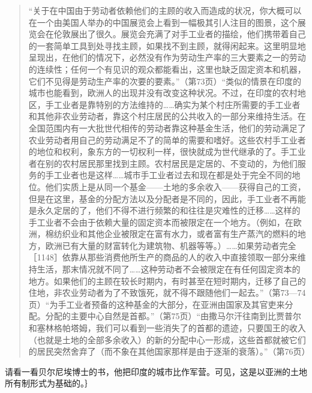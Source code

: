 \begin{quote}{“关于在中国由于劳动者依赖他们的主顾的收入而造成的状况，你大概可以在一个由美国人举办的中国展览会上看到一幅极其引人注目的图景，这个展览会在伦敦展出了很久。展览会充满了对手工业者的描绘，他们携带着自己的一套简单工具到处寻找主顾，如果找不到主顾，就得闲起来。这里明显地呈现出，在他们的情况下，必然没有作为劳动生产率的三大要素之一的劳动的连续性；任何一个有见识的观众都能看出，这里也缺乏固定资本和机器，它们不见得是劳动生产率的次要的要素。”（第73页）“类似的情景在印度的城市也能看到，欧洲人的出现并没有改变这种状况。不过，在印度的农村地区，手工业者是靠特别的方法维持的……确实为某个村庄所需要的手工业者和其他非农业劳动者，靠这个村庄居民的公共收入的一部分来维持生活。在全国范围内有一大批世代相传的劳动者靠这种基金生活，他们的劳动满足了农业劳动者用自己的劳动满足不了的简单的需要和嗜好。这些农村手工业者的地位和权利，象东方的一切权利一样，很快就成为世代继承的了。手工业者在别的农村居民那里找到主顾。农村居民是定居的、不变动的，为他们服务的手工业者也是这样……城市手工业者过去和现在都是处于完全不同的地位。他们实质上是从同一个基金——土地的多余收入——获得自己的工资，但是在这里，基金的分配方法以及分配者是不同的，因此，手工业者不再能是永久定居的了，他们不得不进行频繁的和往往是灾难性的迁移……这样的手工业者不会由于依赖大量的固定资本而被限定在一个地方。（例如，在欧洲，棉纺织业和其他企业被限定在富有水力，或者富有生产蒸汽的燃料的地方，欧洲已有大量的财富转化为建筑物、机器等等。）……如果劳动者完全［1148］依靠从那些消费他所生产的商品的人的收入中直接领取一部分来维持生活，那末情况就不同了……这种劳动者不会被限定在有任何固定资本的地方。如果他们的主顾在较长时期内，有时甚至在短时期内，迁移了自己的住地，非农业劳动者为了不致饿死，就不得不跟随他们一起去。”（第73—74页）“为手工业者预备的这种基金的大部分，在亚洲由国家及其官吏来分配。分配的主要中心自然是首都。”（第75页）“由撒马尔汗往南到比贾普尔和塞林格帕塔姆，我们可以看到一些消失了的首都的遗迹，只要国王的收入（也就是土地的全部多余收入）的新的分配中心一形成，这些首都就被它们的居民突然舍弃了（而不象在其他国家那样是由于逐渐的衰落）。”（第76页）}\end{quote}

请看一看贝尔尼埃博士的书，他把印度的城市比作军营。可见，这是以亚洲的土地所有制形式为基础的。｝


